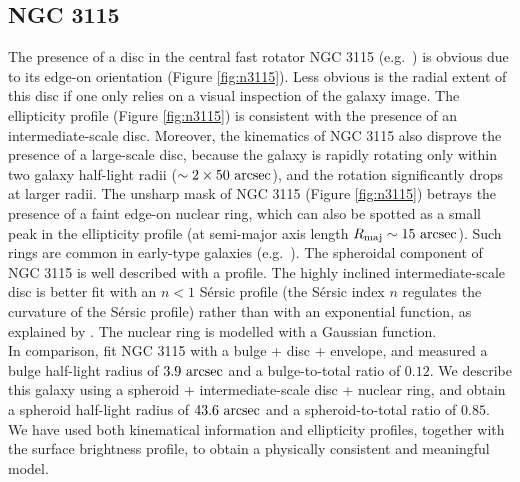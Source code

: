 \documentclass[useAMS,usenatbib,article]{mnras}
\begin{document}
\subsection{NGC 3115}
The presence of a disc in the central fast rotator NGC 3115 
(e.g.~\citealt{strom1977,nieto1988,scorzabender1995}) 
is obvious due to its edge-on orientation (Figure \ref{fig:n3115}). 
Less obvious is the radial extent of this disc if one only relies on a visual inspection of the galaxy image. 
The ellipticity profile (Figure \ref{fig:n3115}) is consistent with the presence of an intermediate-scale disc. 
Moreover, the kinematics of NGC 3115 \citep{arnold2011n3115} also disprove the presence of a large-scale disc, 
because the galaxy is rapidly rotating only within two galaxy half-light radii ($\sim 2 \times 50~\rm arcsec$), 
and the rotation significantly drops at larger radii.  
The unsharp mask of NGC 3115 (Figure \ref{fig:n3115}) betrays the presence of a faint edge-on nuclear ring, 
which can also be spotted as a small peak in the ellipticity profile 
(at semi-major axis length $R_{\rm maj} \sim 15~\rm arcsec$). 
Such rings are common in early-type galaxies (e.g.~\citealt{michardmarchal1993}).
The spheroidal component of NGC 3115 is well described with a \cite{sersic1963} profile.
The highly inclined intermediate-scale disc is better fit with an $n<1$ S\'ersic profile 
(the S\'ersic index $n$ regulates the curvature of the S\'ersic profile) 
rather than with an exponential function, 
as explained by \cite{pastrav2013a}. 
The nuclear ring is modelled with a Gaussian function. \\
In comparison, \cite{lasker2014data} fit NGC 3115 with a bulge + disc + envelope, 
and measured a bulge half-light radius of $3.9~\rm arcsec$ and a bulge-to-total ratio of $0.12$. 
We describe this galaxy using a spheroid + intermediate-scale disc + nuclear ring, 
and obtain a spheroid half-light radius of $43.6~\rm arcsec$ and a spheroid-to-total ratio of $0.85$. 
We have used both kinematical information and ellipticity profiles, 
together with the surface brightness profile, 
to obtain a physically consistent and meaningful model. 
\end{document}
